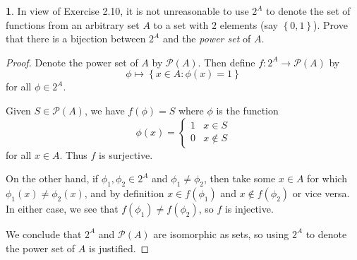 \documentclass{article}
\newcounter{section-number}
\theoremstyle{definition}
\newtheorem{ex}{}[section-number]
\begin{document}
\begin{ex}
	In view of Exercise 2.10, it is not unreasonable to use $2^A$ to denote the set of functions from an arbitrary set $A$ to a set with $2$ elements (say $\left\lbrace 0, 1 \right\rbrace$).
	Prove that there is a bijection between $2^A$ and the \textit{power set} of $A$.
\end{ex}
\begin{proof}
	Denote the power set of $A$ by $\mathscr{P}(A)$.
	Then define $f: 2^A \to \mathscr{P}(A)$ by \begin{equation*}
		\phi \mapsto \left\lbrace x \in A : \phi(x) = 1 \right\rbrace
	\end{equation*}
	for all $\phi \in 2^A$.

	Given $S \in \mathscr{P}(A)$, we have $f(\phi) = S$ where $\phi$ is the function \begin{equation*}
		\phi(x) = \begin{cases}
			1 & x \in S    \\
			0 & x \notin S
		\end{cases}
	\end{equation*}
	for all $x \in A$.
  Thus $f$ is surjective.

  On the other hand, if $\phi_1, \phi_2 \in 2^A$ and $\phi_1 \neq \phi_2$, then take some $x \in A$ for which $\phi_1(x) \neq \phi_2(x)$, and by definition $x \in f(\phi_1)$ and $x \notin f(\phi_2)$ or vice versa.
  In either case, we see that $f(\phi_1) \neq f(\phi_2)$, so $f$ is injective.

  We conclude that $2^A$ and $\mathscr{P}(A)$ are isomorphic as sets, so using $2^A$ to denote the power set of $A$ is justified.
\end{proof}
\end{document}
